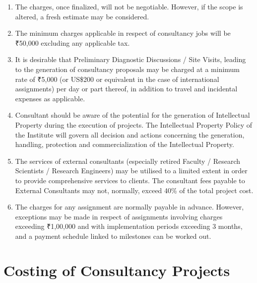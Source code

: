 \documentclass[
  10pt,
  a5paper,
  10pt,
  openany]{amsbook}
\begin{document}
\begin{enumerate}
  intimation to the Dean (R\&D), and then seek approval, for tasks
  entailing total charges not more than ₹50,000 or, two days of faculty
  time, and payments are made immediately, well before submission of any
  formal report.
\item
  The charges, once finalized, will not be negotiable. However, if the
  scope is altered, a fresh estimate may be considered.
\item
  The minimum charges applicable in respect of consultancy jobs will be
  ₹50,000 excluding any applicable tax.
\item
  It is desirable that Preliminary Diagnostic Discussions / Site Visits,
  leading to the generation of consultancy proposals may be charged at a
  minimum rate of ₹5,000 (or US\$200 or equivalent in the case of
  international assignments) per day or part thereof, in addition to
  travel and incidental expenses as applicable.
\item
  Consultant should be aware of the potential for the generation of
  Intellectual Property during the execution of projects. The
  Intellectual Property Policy of the Institute will govern all decision
  and actions concerning the generation, handling, protection and
  commercialization of the Intellectual Property.
\item
  The services of external consultants (especially retired Faculty /
  Research Scientists / Research Engineers) may be utilised to a limited
  extent in order to provide comprehensive services to clients. The
  consultant fees payable to External Consultants may not, normally,
  exceed 40\% of the total project cost.
\item
  The charges for any assignment are normally payable in advance.
  However, exceptions may be made in respect of assignments involving
  charges exceeding ₹1,00,000 and with implementation periods exceeding
  3 months, and a payment schedule linked to milestones can be worked
  out.
\end{enumerate}

\section{Costing of Consultancy
Projects}\label{costing-of-consultancy-projects}
\end{document}
